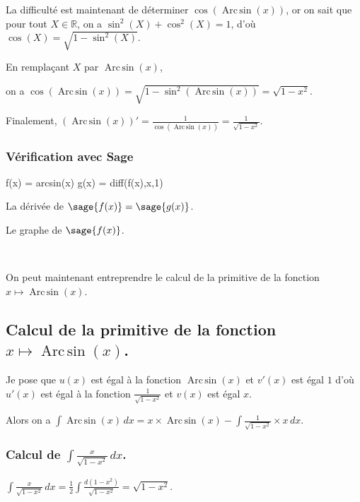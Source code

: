 \documentclass[a4paper,14pt]{extreport} %
\def\eclaire{\mathbb}
\def\R{\ensuremath{\eclaire R}}
\renewcommand{\arcsin}{\mathop{\mathrm{Arc\,sin}}}
\begin{document}
La difficulté est maintenant de déterminer $\cos(\arcsin(x))$, or on sait que pour tout $X \in \R$, on a $\sin^2(X) + \cos^2(X) = 1$, d'où $\cos(X) = \sqrt{1-\sin^2(X)}$.

En remplaçant $X$ par $\arcsin(x)$, 

on a $\cos(\arcsin(x)) = \sqrt{1-\sin^2(\arcsin(x))} = \sqrt{1- x^2}$.

Finalement, $(\arcsin(x))' = \frac{1}{\cos(\arcsin(x))} =  \frac{1}{\sqrt{1- x^2}} $.

\subsubsection{Vérification avec Sage}

\begin{sageblock}
    f(x) = arcsin(x)
    g(x) = diff(f(x),x,1)
\end{sageblock}

La dérivée de $\sage{f(x)} = \sage{g(x)} $.


Le graphe de $\sage{f(x)} $.


\begin{center}
 \\
\end{center}




On peut maintenant entreprendre le calcul de la primitive de la  fonction  $x \mapsto \arcsin(x) $.





\subsection{Calcul de la primitive de la fonction  $x \mapsto \arcsin(x) $.}


Je pose que $u(x)$  est égal à la fonction $\arcsin(x)$ et $v'(x)$ est égal $1$  d'où $u'(x)$  est égal à la fonction $ \frac{1}{\sqrt{1- x^2}} $ et $v(x)$ est égal $x$.

Alors on a $\int \arcsin(x) \, dx = x \times \arcsin(x) -\int \frac{1}{\sqrt{1- x^2}} \times x \, dx $.


\subsubsection{Calcul de $\int \frac{x}{\sqrt{1- x^2}} \, dx $.}

$\int \frac{x}{\sqrt{1- x^2}} \, dx = \frac{1}{2} \int \frac{d(1-x^2)}{\sqrt{1- x^2}}= \sqrt{1- x^2} $.
\end{document}
